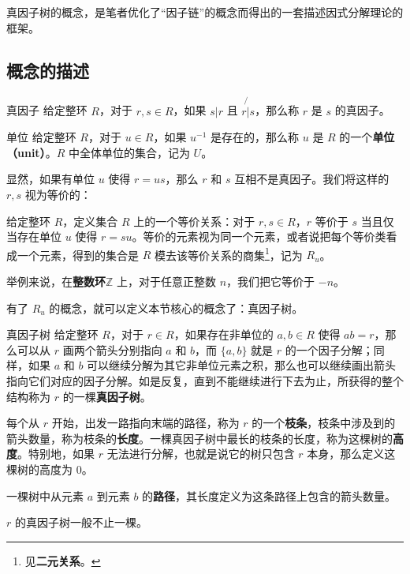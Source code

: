 

真因子树的概念，是笔者优化了“因子链”的概念而得出的一套描述因式分解理论的框架。

\subsection{概念的描述}

\begin{definition}{真因子}
给定整环 $R$，对于 $r, s\in R$，如果 $s|r$ 且 $r\not{|}s$，那么称 $r$ 是 $s$ 的真因子。
\end{definition}

\begin{definition}{单位}\label{def_FctTre_3}
给定整环 $R$，对于 $u\in R$，如果 $u^{-1}$ 是存在的，那么称 $u$ 是 $R$ 的一个\textbf{单位（unit）}。$R$ 中全体单位的集合，记为 $U$。
\end{definition}

显然，如果有单位 $u$ 使得 $r=us$，那么 $r$ 和 $s$ 互相不是真因子。我们将这样的 $r, s$ 视为等价的：

\begin{definition}{}\label{def_FctTre_2}
给定整环 $R$，定义集合 $R$ 上的一个等价关系：对于 $r, s\in R$，$r$ 等价于 $s$ 当且仅当存在单位 $u$ 使得 $r=su$。等价的元素视为同一个元素，或者说把每个等价类看成一个元素，得到的集合是 $R$ 模去该等价关系的商集\footnote{见\textbf{二元关系}。}，记为 $R_u$。
\end{definition}

举例来说，在\textbf{整数环}$\mathbb{Z}$ 上，对于任意正整数 $n$，我们把它等价于 $-n$。


有了 $R_u$ 的概念，就可以定义本节核心的概念了：真因子树。

\begin{definition}{真因子树}
给定整环 $R$，对于 $r\in R$，如果存在非单位的 $a, b\in R$ 使得 $ab=r$，那么可以从 $r$ 画两个箭头分别指向 $a$ 和 $b$，而 $\{a, b\}$ 就是 $r$ 的一个因子分解；同样，如果 $a$ 和 $b$ 可以继续分解为其它非单位元素之积，那么也可以继续画出箭头指向它们对应的因子分解。如是反复，直到不能继续进行下去为止，所获得的整个结构称为 $r$ 的一棵\textbf{真因子树}。

每个从 $r$ 开始，出发一路指向末端的路径，称为 $r$ 的一个\textbf{枝条}，枝条中涉及到的箭头数量，称为枝条的\textbf{长度}。一棵真因子树中最长的枝条的长度，称为这棵树的\textbf{高度}。特别地，如果 $r$ 无法进行分解，也就是说它的树只包含 $r$ 本身，那么定义这棵树的高度为 $0$。

一棵树中从元素 $a$ 到元素 $b$ 的\textbf{路径}，其长度定义为这条路径上包含的箭头数量。

$r$ 的真因子树一般不止一棵。
\end{definition}

